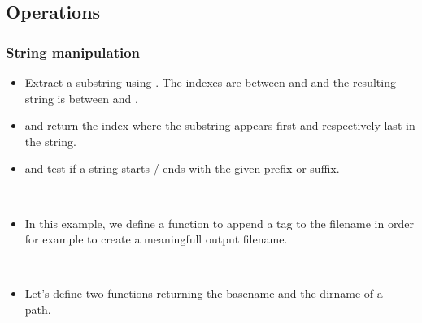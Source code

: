 \subsection{Operations}
\begin{frame}
  \frametitle<presentation>{String manipulation}
  \begin{itemize}
  \item Extract a substring using . The indexes are between  and
     and the resulting string is between
     and .
  \item {} and
     return the index where the
    substring appears first and respectively last in the string.
  \item {} and  test if a string starts / ends with the given prefix or
    suffix.
  \end{itemize}
\end{frame}

\begin{frame}[fragile]
  \begin{example}~\par
    \begin{itemize}
    \item In this example, we define a function to append a tag to the
      filename in order for example to create a meaningfull output
      filename.~\par
      
    \end{itemize}
  \end{example}
\end{frame}

\begin{frame}[fragile]
  \begin{example}~\par
    \begin{itemize}
    \item Let's define two functions returning the basename and the
      dirname of a path.~\par
      
    \end{itemize}
  \end{example}
\end{frame}

